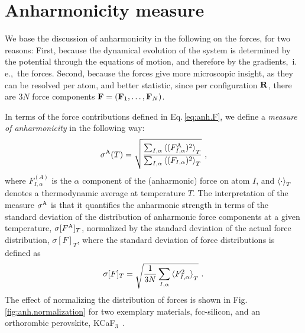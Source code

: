\section{Anharmonicity measure}

We base the discussion of anharmonicity in the following on the forces, for two reasons: First, because the dynamical evolution of the system is determined by the potential through the equations of motion, and therefore by the gradients,~i.\,e.,~the forces. Second, because the forces give more microscopic insight, as they can be resolved per atom, and better statistic, since per configuration $\bf R$, there are $3N$ force components ${\bf F} = ({\bf F}_1, \ldots, {\bf F}_N)$.

In terms of the force contributions defined in Eq.\,\eqref{eq:anh.F}, we define a \emph{measure of anharmonicity} in the following way:
\begin{align}
	\sigmaA (T)
		= \sqrt{\frac{\sum_{I, \alpha} \braket{(F^{\rm A}_{I, \alpha})^2}_T}{\sum_{I, \alpha} \braket{(F_{I, \alpha})^2}_T}}~,
	\label{eq:sigmaA}
\end{align}
where $F_{I, \alpha}^{(A)}$ is the $\alpha$ component of the (anharmonic) force on atom $I$, and $\braket{\cdot}_T$ denotes a thermodynamic average at temperature $T$. The interpretation of the measure $\sigma^\mathrm{A}$ is that it quantifies the anharmonic strength in terms of the standard deviation of the distribution of anharmonic force components at a given temperature, $\sigma [F^{\rm A}]_T$, normalized by the standard deviation of the actual force distribution, $\sigma [F]_T$, where the standard deviation of force distributions is defined as
\begin{align}
	\sigma [F]_T 
		= \sqrt{\frac{1}{3N} \sum_{I, \alpha} \braket{F_{I, \alpha}^2}_T}~.
\end{align}
The effect of normalizing the distribution of forces is shown in Fig.\,\ref{fig:anh.normalization} for two exemplary materials, fcc-silicon, and an orthorombic perovskite, KCaF$_3$~.
